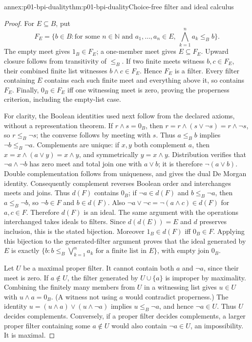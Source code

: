\begin{annexitem}{annex:p01-bpi-duality}{thm:p01-bpi-duality}{Choice-free filter and ideal calculus}
\begin{proof}
For \(E\subseteq B\), put
\[
 F_E=\{b\in B:\text{for some }n\in\mathbb N\text{ and }a_1,\ldots,a_n\in E,
                    \ \bigwedge_{k=1}^{n}a_k\leq_B b\}.
\]
The empty meet gives \(1_B\in F_E\); a one-member meet gives
\(E\subseteq F_E\). Upward closure follows from transitivity of
\(\leq_B\). If two finite meets witness \(b,c\in F_E\), their
combined finite list witnesses \(b\wedge c\in F_E\). Hence \(F_E\)
is a filter. Every filter containing \(E\) contains each such finite
meet and everything above it, so contains \(F_E\). Finally,
\(0_B\in F_E\) iff one witnessing meet is zero, proving the
properness criterion, including the empty-list case.

For clarity, the Boolean identities used next follow from the declared
axioms, without a representation theorem. If \(r\wedge s=0_B\), then
\(r=r\wedge(s\vee\neg s)=r\wedge\neg s\), so
\(r\leq_B\neg s\); the converse follows by meeting with \(s\).
Thus \(a\leq_B b\) implies \(\neg b\leq_B\neg a\).
Complements are unique: if \(x,y\) both complement \(a\), then
\(x=x\wedge(a\vee y)=x\wedge y\), and symmetrically
\(y=x\wedge y\). Distribution verifies that \(\neg a\wedge\neg b\)
has zero meet and total join one with \(a\vee b\); it is therefore
\(\neg(a\vee b)\). Double complementation follows from uniqueness,
and gives the dual De Morgan identity. Consequently complement reverses
Boolean order and interchanges meets and joins. Thus
\(d(F)\) contains \(0_B\); if \(\neg a\in d(F)\) and
\(b\leq_B\neg a\), then \(a\leq_B\neg b\), so
\(\neg b\in F\) and \(b\in d(F)\). Also
\(\neg a\vee\neg c=\neg(a\wedge c)\in d(F)\) for
\(a,c\in F\). Therefore \(d(F)\) is an ideal. The same argument
with the operations interchanged takes ideals to filters.
Since \(d(d(E))=E\) and \(d\) preserves inclusion, this is the
stated bijection. Moreover \(1_B\in d(F)\) iff \(0_B\in F\).
Applying this bijection to the generated-filter argument proves that the
ideal generated by \(E\) is exactly
\(\{b:b\leq_B\bigvee_{k=1}^{n}a_k\text{ for a finite list in }E\}\),
with empty join \(0_B\).

Let \(U\) be a maximal proper filter. It cannot contain both
\(a\) and \(\neg a\), since their meet is zero. If \(a\notin U\),
the filter generated by \(U\cup\{a\}\) is improper by maximality.
Combining the finitely many members from \(U\) in a witnessing list
gives \(u\in U\) with \(u\wedge a=0_B\). (A witness not using
\(a\) would contradict properness.) The identity
\(u=(u\wedge a)\vee(u\wedge\neg a)\) implies
\(u\leq_B\neg a\), and hence \(\neg a\in U\).
Thus \(U\) decides complements. Conversely, if a proper filter decides
complements, a larger proper filter containing some \(a\notin U\)
would also contain \(\neg a\in U\), an impossibility. It is maximal.


\end{proof}
\end{annexitem}
